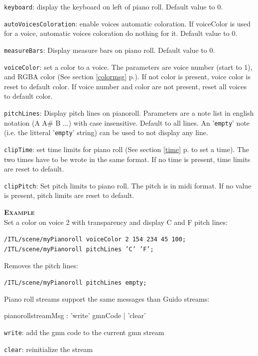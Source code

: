 \documentclass[a4paper,twoside]{report}
\newcommand{\fullref}[1]	{\ref{#1} p.\pageref{#1}}
\newcommand{\OSC}[1]		{\texttt{#1}}
\newcommand{\example}		{\textbf{\hspace{-1.5cm}\textbf{\textsc{Example }}}}
\let\olditemize\itemize
\let\oldenditemize\enditemize
\renewenvironment{itemize} 	{\olditemize \setlength{\itemsep}{1mm}}{\oldenditemize}
\newcommand{\sample}	[1]			{\vspace{-2mm}\begin{center}\colorbox{mygrey}{
								\begin{minipage}[t]{0.9\columnwidth} 
								{\small \texttt{#1}}
								\end{minipage}}\end{center}}
\begin{document}
\begin{itemize}
\item \OSC{keyboard}: display the keyboard on left of piano roll. Default value to 0.
\item \OSC{autoVoicesColoration}: enable voices automatic coloration. If voiceColor is used for a voice, automatic voices coloration do nothing for it. Default value to 0.
\item \OSC{measureBars}: Display measure bars on piano roll. Default value to 0.
\item \OSC{voiceColor}: set a color to a voice. The parameters are voice number (start to 1), and RGBA color (See section \fullref{colormsg}). If not color is present, voice color is reset to default color. If voice number and color are not present, reset all voices to default color.
\item \OSC{pitchLines}:  Display pitch lines on pianoroll. Parameters are a note list in english notation (A A\# B ...) with case insensitive. Default to all lines. An '\OSC{empty}' note (i.e. the litteral '\OSC{empty}' string)  can be used to not display any line.
\item \OSC{clipTime}: set time limits for piano roll (See section \fullref{time} to set a time). The two times have to be wrote in the same format. If no time is present, time limits are reset to default.
\item \OSC{clipPitch}:  Set pitch limits to piano roll. The pitch is in midi format. If no value is present, pitch limits are reset to default.
\end{itemize}


\example \\
Set a color on voice 2 with transparency and display C and F pitch lines: 
\sample{/ITL/scene/myPianoroll voiceColor 2 154 234 45 100;\\
/ITL/scene/myPianoroll pitchLines 'C' 'F';
}
Removes the pitch lines: 
\sample{/ITL/scene/myPianoroll pitchLines empty;
}

Piano roll streams support the same messages than Guido streams:
\begin{rail}
pianorollstreamMsg :      'write' gmnCode
				| 'clear' 
\end{rail}

\begin{itemize}
\item \OSC{write}: add the gmn code to the current gmn stream
\item \OSC{clear}: reinitialize the stream
\end{itemize}
\end{document}
